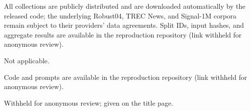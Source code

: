 \documentclass[pdflatex,sn-basic,Numbered]{sn-jnl}
\begin{document}
All collections are publicly distributed and are downloaded automatically by the released code; the underlying Robust04, TREC News, and Signal-1M corpora remain subject to their providers' data agreements. Split IDs, input hashes, and aggregate results are available in the reproduction repository (link withheld for anonymous review).

Not applicable.

Code and prompts are available in the reproduction repository (link withheld for anonymous review).

Withheld for anonymous review; given on the title page.


\end{document}
